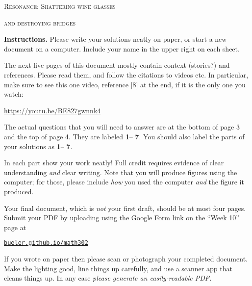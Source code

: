 \documentclass[12pt]{article}
\theoremstyle{definition}
\begin{document}
\setcounter{page}{0}
\renewcommand{\d}{\displaystyle}

\strut
\centerline{{\Large \textsc{Resonance: Shattering wine glasses}}}

\medskip
\centerline{{\Large \textsc{and destroying bridges}}}

\bigskip

\noindent \textbf{Instructions.}  Please write your solutions neatly on paper, or start a new document on a computer.  Include your name in the upper right on each sheet.

\medskip
The next five pages of this document mostly contain context (stories?) and references.  Please read them, and follow the citations to videos etc.  In particular, make sure to see this one video, reference [8] at the end, if it is the only one you watch:

\medskip
\centerline{\url{https://youtu.be/BE827gwnnk4}}

\medskip
The actual questions that you will need to answer are at the bottom of page 3 and the top of page 4.  They are labeled \textbf{1}-- \textbf{7}.  You should also label the parts of your solutions as \textbf{1}-- \textbf{7}.

\medskip
In each part show your work neatly!  Full credit requires evidence of clear understanding \emph{and} clear writing.  Note that you will produce figures using the computer; for those, please include \emph{how} you used the computer \emph{and} the figure it produced.

\medskip
Your final document, which is \emph{not} your first draft, should be at most four pages.  Submit your PDF by uploading using the Google Form link on the ``Week 10'' page at

\smallskip
     \centerline{\href{https://bueler.github.io/math302/index.html}{\texttt{bueler.github.io/math302}}}
 
\noindent If you wrote on paper then please scan or photograph your completed document.  Make the lighting good, line things up carefully, and use a scanner app that cleans things up.  In any case \emph{please generate an easily-readable PDF.}
\end{document}
